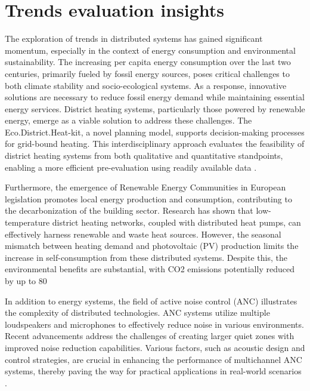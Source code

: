 \documentclass[runningheads]{llncs}
\begin{document}
\section{Trends evaluation insights}
The exploration of trends in distributed systems has gained significant momentum, especially in the context of energy consumption and environmental sustainability. The increasing per capita energy consumption over the last two centuries, primarily fueled by fossil energy sources, poses critical challenges to both climate stability and socio-ecological systems. As a response, innovative solutions are necessary to reduce fossil energy demand while maintaining essential energy services. District heating systems, particularly those powered by renewable energy, emerge as a viable solution to address these challenges. The Eco.District.Heat-kit, a novel planning model, supports decision-making processes for grid-bound heating. This interdisciplinary approach evaluates the feasibility of district heating systems from both qualitative and quantitative standpoints, enabling a more efficient pre-evaluation using readily available data \cite{Susanna_2019}.

Furthermore, the emergence of Renewable Energy Communities in European legislation promotes local energy production and consumption, contributing to the decarbonization of the building sector. Research has shown that low-temperature district heating networks, coupled with distributed heat pumps, can effectively harness renewable and waste heat sources. However, the seasonal mismatch between heating demand and photovoltaic (PV) production limits the increase in self-consumption from these distributed systems. Despite this, the environmental benefits are substantial, with CO2 emissions potentially reduced by up to 80%

In addition to energy systems, the field of active noise control (ANC) illustrates the complexity of distributed technologies. ANC systems utilize multiple loudspeakers and microphones to effectively reduce noise in various environments. Recent advancements address the challenges of creating larger quiet zones with improved noise reduction capabilities. Various factors, such as acoustic design and control strategies, are crucial in enhancing the performance of multichannel ANC systems, thereby paving the way for practical applications in real-world scenarios \cite{Yijing_2022}.
\end{document}
